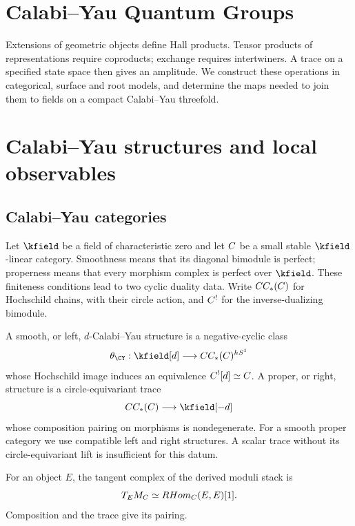 \cleardoublepage
{}
{}
\chapter*{Calabi--Yau Quantum Groups}
\begin{summarybox}
Extensions of geometric objects define Hall products. Tensor products
of representations require coproducts; exchange requires intertwiners.
A trace on a specified state space then gives an amplitude. We construct
these operations in categorical, surface and root models, and determine
the maps needed to join them to fields on a compact Calabi--Yau threefold.
\end{summarybox}

\chapter{Calabi--Yau structures and local observables}

\section{Calabi--Yau categories}
Let $\kfield$ be a field of characteristic zero and let $C$ be a
small stable $\kfield$-linear category. Smoothness means that its diagonal
bimodule is perfect; properness means that every morphism complex is
perfect over $\kfield$. These finiteness conditions lead to two cyclic
duality data. Write $CC_*(C)$ for Hochschild chains, with their circle
action, and $C^!$ for the inverse-dualizing bimodule.

A smooth, or left, $d$-Calabi--Yau structure is a negative-cyclic class
\[
 \theta_{\CY}:\kfield[d]\longrightarrow CC_*(\Ccal)^{hS^1}
\]
whose Hochschild image induces an equivalence
$C^![d]\simeq C$. A proper, or right, structure is a
circle-equivariant trace
\[
 CC_*(\Ccal)\longrightarrow\kfield[-d]
\]
whose composition pairing on morphisms is nondegenerate. For a smooth
proper category we use compatible left and right structures. A scalar
trace without its circle-equivariant lift is insufficient for this datum.

For an object $E$, the tangent complex of the derived moduli stack is
\[
 T_EM_{C}\simeq RHom_{C}(E,E)[1].
\]
Composition and the trace give its pairing.


